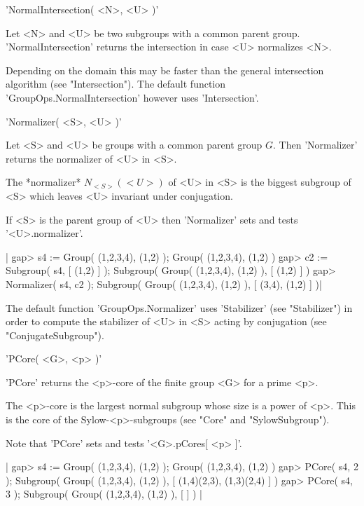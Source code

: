 
'NormalIntersection( <N>, <U> )'

Let  <N>  and  <U>  be  two  subgroups   with  a  common   parent  group.
'NormalIntersection' returns the intersection in case <U> normalizes <N>.

Depending on the domain this may be faster  than the general intersection
algorithm     (see       "Intersection").    The     default     function
'GroupOps.NormalIntersection' however uses 'Intersection'.


'Normalizer( <S>, <U> )'

Let   <S> and <U>  be groups  with  a  common   parent  group  $G$.  Then
'Normalizer' returns the normalizer of <U> in <S>.

The *normalizer* $N_{<S>}( <U> )$  of <U> in  <S> is the biggest subgroup
of <S> which leaves <U> invariant under conjugation.

If <S>  is  the parent group of   <U>  then 'Normalizer'  sets and  tests
'<U>.normalizer'.

|    gap> s4 := Group( (1,2,3,4), (1,2) );
    Group( (1,2,3,4), (1,2) )
    gap> c2 := Subgroup( s4, [ (1,2) ] );
    Subgroup( Group( (1,2,3,4), (1,2) ), [ (1,2) ] )
    gap> Normalizer( s4, c2 );
    Subgroup( Group( (1,2,3,4), (1,2) ), [ (3,4), (1,2) ] )|

The  default  function   'GroupOps.Normalizer'  uses    'Stabilizer' (see
"Stabilizer") in order to compute the stabilizer of <U> in  <S> acting by
conjugation (see "ConjugateSubgroup").


'PCore( <G>, <p> )'

'PCore' returns the <p>-core of the finite group <G> for a prime <p>.

The <p>-core is the largest normal subgroup whose size is a power of <p>.
This   is  the  core   of  the  Sylow-<p>-subgroups   (see   "Core"   and
"SylowSubgroup").

Note that 'PCore' sets and tests '<G>.pCores[ <p> ]'.

|    gap> s4 := Group( (1,2,3,4), (1,2) );
    Group( (1,2,3,4), (1,2) )
    gap> PCore( s4, 2 );
    Subgroup( Group( (1,2,3,4), (1,2) ), [ (1,4)(2,3), (1,3)(2,4) ] )
    gap> PCore( s4, 3 );
    Subgroup( Group( (1,2,3,4), (1,2) ), [  ] ) |

